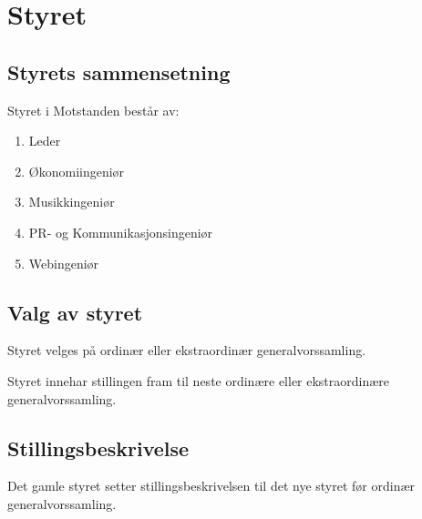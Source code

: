 \section{Styret}
    \subsection{Styrets sammensetning}
        \begin{statute}
            Styret i Motstanden består av:
            \begin{enumerate}[font = \bfseries]
                \item Leder
                \item Økonomiingeniør
                \item Musikkingeniør
                \item PR- og Kommunikasjonsingeniør
                \item Webingeniør
            \end{enumerate}
        \end{statute}

    \subsection{Valg av styret}
        \begin{statute}
            Styret velges på ordinær eller ekstraordinær generalvorssamling.
        \end{statute}
        \begin{statute}
            Styret innehar stillingen fram til neste ordinære eller ekstraordinære generalvorssamling.
        \end{statute}
        
    \subsection{Stillingsbeskrivelse}
        \begin{statute}
            Det gamle styret setter stillingsbeskrivelsen til det nye styret før ordinær generalvorssamling.
        \end{statute}
      